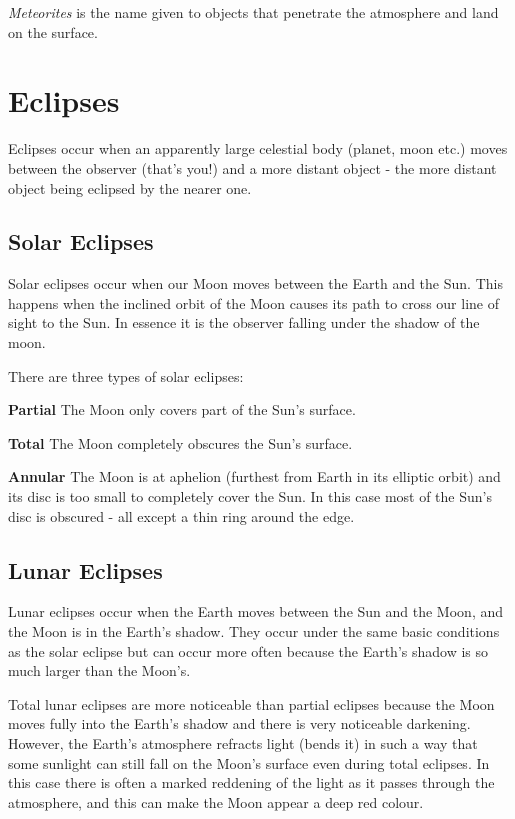 \emph{Meteorites} is the name given to objects that penetrate the
atmosphere and land on the surface.

\section{Eclipses}\label{eclipses}

Eclipses occur when an apparently large celestial body (planet, moon
etc.) moves between the observer (that's you!) and a more distant object
- the more distant object being eclipsed by the nearer one.

\subsection{Solar Eclipses}\label{solar-eclipses}

Solar eclipses occur when our Moon moves between the Earth and the Sun.
This happens when the inclined orbit of the Moon causes its path to
cross our line of sight to the Sun. In essence it is the observer
falling under the shadow of the moon.

There are three types of solar eclipses:

\textbf{Partial} The Moon only covers part of the Sun's surface.

\textbf{Total} The Moon completely obscures the Sun's surface.

\textbf{Annular} The Moon is at aphelion (furthest from Earth in its
elliptic orbit) and its disc is too small to completely cover the Sun.
In this case most of the Sun's disc is obscured - all except a thin ring
around the edge.

\subsection{Lunar Eclipses}\label{lunar-eclipses}

Lunar eclipses occur when the Earth moves between the Sun and the Moon,
and the Moon is in the Earth's shadow. They occur under the same basic
conditions as the solar eclipse but can occur more often because the
Earth's shadow is so much larger than the Moon's.

Total lunar eclipses are more noticeable than partial eclipses because
the Moon moves fully into the Earth's shadow and there is very
noticeable darkening. However, the Earth's atmosphere refracts light
(bends it) in such a way that some sunlight can still fall on the Moon's
surface even during total eclipses. In this case there is often a marked
reddening of the light as it passes through the atmosphere, and this can
make the Moon appear a deep red colour.

